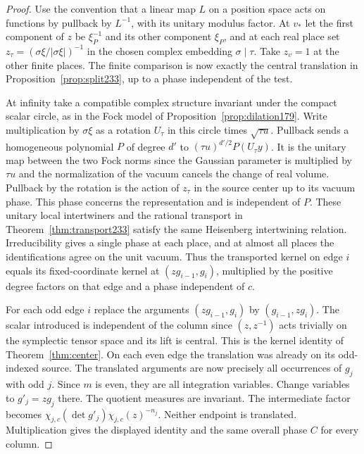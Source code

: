 \documentclass[a4paper,11pt]{article}
\theoremstyle{definition}
\theoremstyle{remark}
\numberwithin{equation}{section}
\begin{document}
\begin{proof}
Use the convention that a linear map \(L\) on a position space
acts on functions by pullback by \(L^{-1}\), with its unitary
modulus factor. At \(v_*\) let the first component of \(z\) be
\(\xi_P^{-1}\) and its other component \(\xi_P\), and at each
real place set \(z_\tau=(\sigma\xi/|\sigma\xi|)^{-1}\) in the
chosen complex embedding \(\sigma\mid\tau\). Take \(z_v=1\) at
the other finite places. The finite comparison is now exactly the
central translation in Proposition~\ref{prop:split233}, up to a
phase independent of the test.

At infinity take a compatible complex structure invariant under the
compact scalar circle, as in the Fock model of Proposition~\ref{prop:dilation179}. Write multiplication by
\(\sigma\xi\) as a rotation \(U_\tau\) in this circle times
\(\sqrt{\tau u}\). Pullback sends a homogeneous polynomial \(P\) of
degree \(d'\) to \((\tau u)^{d'/2}P(U_\tau y)\). It is the unitary
map between the two Fock norms since the Gaussian parameter is
multiplied by \(\tau u\) and the normalization of the vacuum
cancels the change of real volume. Pullback by the rotation is the
action of \(z_\tau\) in the source center up to its vacuum phase.
This phase concerns the representation and is independent of \(P\).
These unitary local intertwiners and the rational transport in
Theorem~\ref{thm:transport233} satisfy the same Heisenberg
intertwining relation. Irreducibility gives a single phase at each
place, and at almost all places the
identifications agree on the unit vacuum. Thus the transported
kernel on edge \(i\) equals its fixed-coordinate kernel at
\((zg_{i-1},g_i)\), multiplied by the positive degree factors on
that edge and a phase independent of \(c\).

For each odd edge \(i\) replace the arguments \((zg_{i-1},g_i)\)
by \((g_{i-1},zg_i)\). The scalar introduced is independent of the
column since \((z,z^{-1})\) acts trivially on the symplectic tensor
space and its lift is central. This is the kernel identity of
Theorem~\ref{thm:center}. On each even edge the translation
was already on its odd-indexed source. The translated arguments are
now precisely all occurrences of \(g_j\) with odd \(j\). Since
\(m\) is even, they are all integration variables. Change variables
to \(g'_j=zg_j\) there. The quotient measures are invariant. The
intermediate factor becomes
\(\chi_{j,c}(\det g'_j)\chi_{j,c}(z)^{-n_j}\).
Neither endpoint is translated. Multiplication gives the displayed
identity and the same overall phase \(C\) for every column.
\end{proof}
\end{document}
